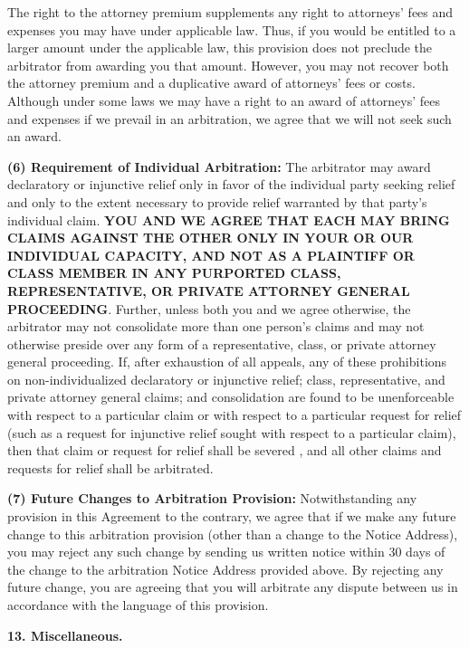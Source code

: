 The right to the attorney premium supplements any right to attorneys'
fees and expenses you may have under applicable law. Thus, if you would
be entitled to a larger amount under the applicable law, this provision
does not preclude the arbitrator from awarding you that amount. However,
you may not recover both the attorney premium and a duplicative award of
attorneys' fees or costs. Although under some laws we may have a right
to an award of attorneys' fees and expenses if we prevail in an
arbitration, we agree that we will not seek such an award.

\textbf{(6) Requirement of Individual Arbitration:} The arbitrator may
award declaratory or injunctive relief only in favor of the individual
party seeking relief and only to the extent necessary to provide relief
warranted by that party's individual claim. \textbf{YOU AND WE AGREE
THAT EACH MAY BRING CLAIMS AGAINST THE OTHER ONLY IN YOUR OR OUR
INDIVIDUAL CAPACITY, AND NOT AS A PLAINTIFF OR CLASS MEMBER IN ANY
PURPORTED CLASS, REPRESENTATIVE, OR PRIVATE ATTORNEY GENERAL
PROCEEDING}. Further, unless both you and we agree otherwise, the
arbitrator may not consolidate more than one person's claims and may not
otherwise preside over any form of a representative, class, or private
attorney general proceeding. If, after exhaustion of all appeals, any of
these prohibitions on non-individualized declaratory or injunctive
relief; class, representative, and private attorney general claims; and
consolidation are found to be unenforceable with respect to a particular
claim or with respect to a particular request for relief (such as a
request for injunctive relief sought with respect to a particular
claim), then that claim or request for relief shall be severed , and all
other claims and requests for relief shall be arbitrated.

\textbf{(7) Future Changes to Arbitration Provision:} Notwithstanding
any provision in this Agreement to the contrary, we agree that if we
make any future change to this arbitration provision (other than a
change to the Notice Address), you may reject any such change by sending
us written notice within 30 days of the change to the arbitration Notice
Address provided above. By rejecting any future change, you are agreeing
that you will arbitrate any dispute between us in accordance with the
language of this provision.

\textbf{13. Miscellaneous.}

